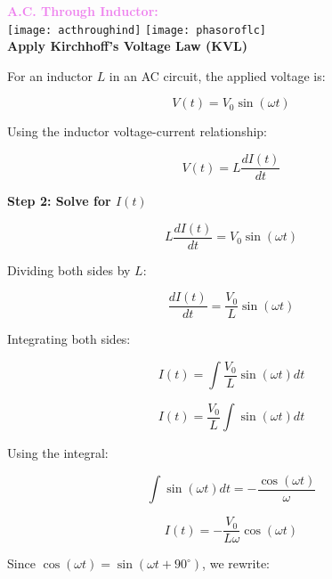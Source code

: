 \documentclass{beamer}
\begin{document}
\begin{frame}
\textcolor{violet}{\textbf{A.C. Through Inductor:}}\\

\texttt{[image: acthroughind]}
\texttt{[image: phasoroflc]}\\
\textbf{Apply Kirchhoff’s Voltage Law (KVL)}

For an inductor \( L \) in an AC circuit, the applied voltage is:

\[
V(t) = V_0 \sin(\omega t)
\]

Using the inductor voltage-current relationship:

\[
V(t) = L \frac{dI(t)}{dt}
\]

\textbf{Step 2: Solve for \( I(t) \)}

\[
L \frac{dI(t)}{dt} = V_0 \sin(\omega t)
\]
\end{frame}



\begin{frame}

Dividing both sides by \( L \):

\[
\frac{dI(t)}{dt} = \frac{V_0}{L} \sin(\omega t)
\]

Integrating both sides:

\[
I(t) = \int \frac{V_0}{L} \sin(\omega t) dt
\]

\[
I(t) = \frac{V_0}{L} \int \sin(\omega t) dt
\]

Using the integral:

\[
\int \sin(\omega t) dt = -\frac{\cos(\omega t)}{\omega}
\]

\[
I(t) = -\frac{V_0}{L \omega} \cos(\omega t)
\]

Since \( \cos(\omega t) = \sin(\omega t + 90^\circ) \), we rewrite:

\end{frame}
\end{document}
